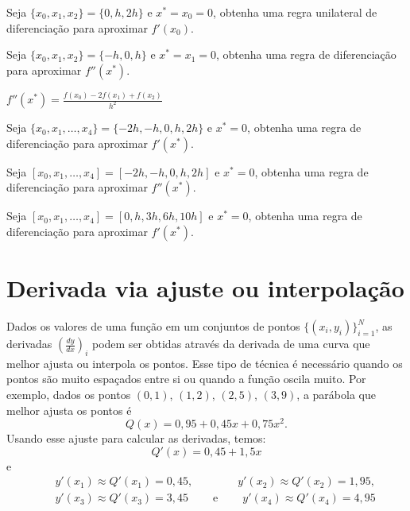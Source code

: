 \begin{exer}
Seja $\{x_0, x_1, x_2\}=\{0, h, 2h\}$ e $x^*=x_0=0$, obtenha uma regra unilateral de diferenciação para aproximar $f'(x_0)$.
\end{exer}%

\begin{exer}
Seja $\{x_0, x_1, x_2\}=\{-h, 0, h\}$ e $x^*=x_1=0$, obtenha uma regra de diferenciação para aproximar $f''(x^*)$.
\end{exer}
\begin{resp}
 $f''(x^*)=\frac{f(x_0)-2f(x_1)+f(x_2)}{h^2}$ 
\end{resp}


\begin{exer}
Seja $\{x_0, x_1, \ldots, x_4\}=\{-2h, -h, 0, h, 2h\}$ e $x^*=0$, obtenha uma regra de diferenciação para aproximar $f'(x^*)$.
\end{exer}%

\begin{exer}
Seja $[x_0,x_1,\ldots ,x_4]=[-2h,-h,0,h,2h]$ e $x^*=0$, obtenha uma regra de diferenciação para aproximar $f''(x^*)$.
\end{exer}%

\begin{exer}
Seja $[x_0,x_1,\ldots ,x_4]=[0,h,3h,6h,10h]$ e $x^*=0$, obtenha uma regra de diferenciação para aproximar $f'(x^*)$.
\end{exer}%

\section{Derivada via ajuste ou interpolação}

Dados os valores de uma função em um conjuntos de pontos $\{(x_i,y_i)\}_{i=1}^N$, as derivadas $\left(\frac{dy}{dx}\right)_i$ podem ser obtidas através da derivada de uma curva que melhor ajusta ou interpola os pontos. Esse tipo de técnica é necessário quando os pontos são muito espaçados entre si ou quando a função oscila muito. Por exemplo, dados os pontos $(0,1)$, $(1,2)$, $(2,5)$, $(3,9)$, a parábola que melhor ajusta os pontos é
$$
Q(x)=0,95 + 0,45x + 0,75x^2.
$$
Usando esse ajuste para calcular as derivadas, temos:
$$
Q'(x)=0,45 + 1,5x
$$
e
\begin{eqnarray*}
&&y'(x_1)\approx Q'(x_1)=0,45, \qquad\qquad y'(x_2)\approx Q'(x_2)=1,95, \\&& y'(x_3)\approx Q'(x_3)=3,45 \qquad ~ \text{e} ~ \qquad y'(x_4)\approx Q'(x_4)=4,95
\end{eqnarray*}

